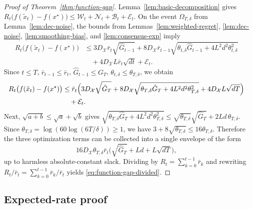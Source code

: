 \documentclass[runningheads]{llncs}
\begin{document}
\begin{proof}[Proof of Theorem~\ref{thm:function-gap}]
Lemma~\ref{lem:basic-decomposition} gives
\(
R_t\bigl(f(\tilde x_t)-f(x^\star)\bigr)
\le
\mathcal W_t+\mathcal N_t+\mathcal B_t+\mathcal E_t.
\)
On the event \(\Omega_{T,\delta}\) from Lemma~\ref{lem:dec-noise}, the bounds
from Lemmas~\ref{lem:weighted-regret}, \ref{lem:dec-noise},
\ref{lem:smoothing-bias}, and \ref{lem:consensus-exp} imply
\begin{align*}
R_t\bigl(f(\tilde x_t)-f(x^\star)\bigr)
&\le
3D_{\mathcal{X}}\bar r_t\sqrt{\hat G_{t-1}}
+
8D_{\mathcal{X}}\bar r_{t-1}
\sqrt{\theta_{t,\delta}\hat G_{t-1}+4L^2d^2\theta_{t,\delta}^2} \\
&\quad+
4D_{\mathcal{X}}L\bar r_t\sqrt{dt}
+
\mathcal E_t.
\end{align*}
Since \(t\le T\), \(\bar r_{t-1}\le \bar r_t\), \(\hat G_{t-1}\le \hat G_T\),
\(\theta_{t,\delta}\le \theta_{T,\delta}\),
we obtain
\begin{align*}
R_t\bigl(f(\tilde x_t)-f(x^\star)\bigr)
&\le
\bar r_t\Bigl(
3D_{\mathcal{X}}\sqrt{\hat G_T}
+
8D_{\mathcal{X}}
\sqrt{\theta_{T,\delta}\hat G_T+4L^2d^2\theta_{T,\delta}^2}
+
4D_{\mathcal{X}}L\sqrt{dT}
\Bigr) \\
&\quad+
\mathcal E_t.
\end{align*}
Next, \(\sqrt{a+b}\le \sqrt a+\sqrt b\) gives
\(
\sqrt{\theta_{T,\delta}\hat G_T+4L^2d^2\theta_{T,\delta}^2}
\le
\sqrt{\theta_{T,\delta}}\sqrt{\hat G_T}+2Ld\,\theta_{T,\delta}.
\)
Since \(\theta_{T,\delta}=\log(60\log(6T/\delta))\ge 1\), we have
\(
3+8\sqrt{\theta_{T,\delta}}\le 16\theta_{T,\delta}.
\)
Therefore the three optimization terms can be collected into a single envelope
of the form
\[
16D_{\mathcal{X}}\theta_{T,\delta}\bar r_t
\bigl(\sqrt{\hat G_T}+Ld+L\sqrt{dT}\bigr),
\]
up to harmless absolute-constant slack. Dividing by
\(
R_t=\sum_{k=0}^{t-1}\bar r_k
\)
and rewriting
\(
R_t/\bar r_t=\sum_{k=0}^{t-1}\bar r_k/\bar r_t
\)
yields \eqref{eq:function-gap-divided}.
\end{proof}

\subsection{Expected-rate proof}\label{app:proof-expected-rate}
\end{document}
